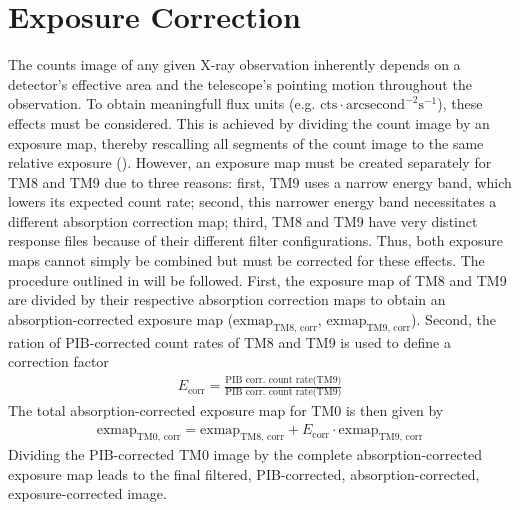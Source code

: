 \section{Exposure Correction}
The counts image of any given X-ray observation inherently depends on a detector's effective area and the telescope's pointing motion throughout the observation. To obtain meaningfull flux units (e.g. \(\text{cts}\cdot\text{arcsecond}^{-2}\text{s}^{-1}\)), these effects must be considered. This is achieved by dividing the count image by an exposure map, thereby rescalling all segments of the count image to the same relative exposure (\cite{davis2001formal}). However, an exposure map must be created separately for TM8 and TM9 due to three reasons: first, TM9 uses a narrow energy band, which lowers its expected count rate; second, this narrower energy band necessitates a different absorption correction map; third, TM8 and TM9 have very distinct response files because of their different filter configurations. Thus, both exposure maps cannot simply be combined but must be corrected for these effects. The procedure outlined in \cite{Reiprich2021} will be followed. First, the exposure map of TM8 and TM9 are divided by their respective absorption correction maps to obtain an absorption-corrected exposure map (\(\text{exmap}_\text{TM8, corr}\), \(\text{exmap}_\text{TM9, corr}\)). Second, the ration of PIB-corrected count rates of TM8 and TM9 is used to define a correction factor 
\begin{align*}
    E_\text{corr} = \frac{\text{PIB corr. count rate(TM9)}}{\text{PIB corr. count rate(TM9)}}
\end{align*}
The total absorption-corrected exposure map for TM0 is then given by
\begin{align*}
    \text{exmap}_\text{TM0, corr} = \text{exmap}_\text{TM8, corr} + E_\text{corr}\cdot\text{exmap}_\text{TM9, corr} 
\end{align*}
Dividing the PIB-corrected TM0 image by the complete absorption-corrected exposure map leads to the final filtered, PIB-corrected, absorption-corrected, exposure-corrected image.
